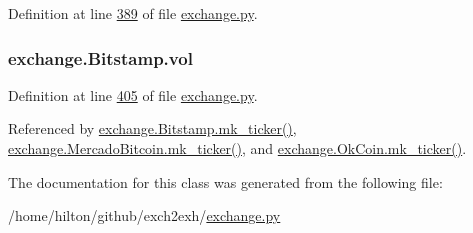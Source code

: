 Definition at line \hyperlink{exchange_8py_source_l00389}{389} of file \hyperlink{exchange_8py_source}{exchange.\+py}.

\subsubsection[{\texorpdfstring{vol}{vol}}]{\setlength{\rightskip}{0pt plus 5cm}exchange.\+Bitstamp.\+vol}\hypertarget{classexchange_1_1_bitstamp_a4ddf3680f552a7d634b3bbea809cc606}{}\label{classexchange_1_1_bitstamp_a4ddf3680f552a7d634b3bbea809cc606}


Definition at line \hyperlink{exchange_8py_source_l00405}{405} of file \hyperlink{exchange_8py_source}{exchange.\+py}.



Referenced by \hyperlink{exchange_8py_source_l00423}{exchange.\+Bitstamp.\+mk\+\_\+ticker()}, \hyperlink{exchange_8py_source_l00557}{exchange.\+Mercado\+Bitcoin.\+mk\+\_\+ticker()}, and \hyperlink{exchange_8py_source_l00622}{exchange.\+Ok\+Coin.\+mk\+\_\+ticker()}.



The documentation for this class was generated from the following file\+:\begin{DoxyCompactItemize}
\item 
/home/hilton/github/exch2exh/\hyperlink{exchange_8py}{exchange.\+py}\end{DoxyCompactItemize}
